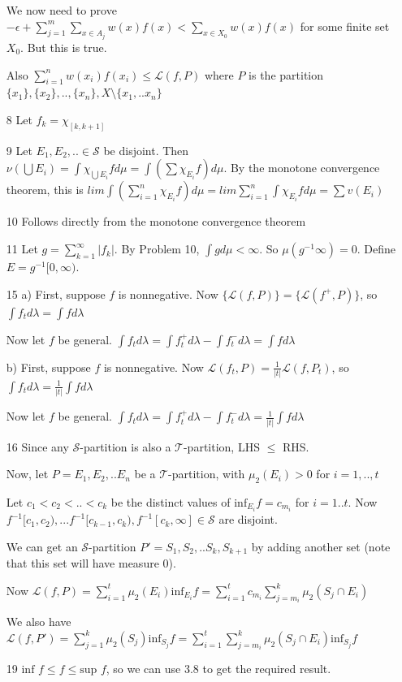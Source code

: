 \documentclass{article}
\begin{document}
\begin{itemize}
    We now need to prove $-\epsilon +\sum_{j=1}^m \sum_{x \in A_j} w(x)f(x)<\sum_{x \in X_0} w(x)f(x)$ for some finite set $X_0$. But this is true.

    Also $\sum_{i=1}^nw(x_i)f(x_i)\leq\mathcal{L}(f,P)$ where $P$ is the partition $\{x_1\},\{x_2\},..,\{x_n\},X\setminus\{x_1,..x_n\}$

    \item[8] Let $f_k=\chi_{[k,k+1]}$

    \item [9]
    Let $E_1,E_2,.. \in \mathcal{S}$ be disjoint. Then $\nu(\bigcup E_i)=\int \chi_{\bigcup E_i}fd\mu=\int (\sum \chi_{E_i}f)d\mu$. By the monotone convergence theorem, this is $lim\int (\sum_{i=1}^n \chi_{E_i}f)d\mu=lim \sum_{i=1}^n \int \chi_{E_i}fd\mu=\sum v(E_i)$

    \item [10] Follows directly from the monotone convergence theorem

    \item[11] Let $g=\sum_{k=1}^\infty|f_k|$. By Problem 10, $\int gd\mu<\infty$. So $\mu(g^{-1}\infty)=0$. Define $E=g^{-1}[0,\infty)$.

    \item[15]a) First, suppose $f$ is nonnegative. Now $\{\mathcal{L}(f,P)\}=\{\mathcal{L}(f^+,P)\}$, so $\int f_td\lambda=\int fd\lambda$

    Now let $f$ be general. $\int f_td\lambda=\int f_t^+d\lambda-\int f_t^-d\lambda=\int fd\lambda$

    b) First, suppose $f$ is nonnegative. Now $\mathcal{L}(f_t,P)=\frac{1}{|t|}\mathcal{L}(f,P_t)$, so \\$\int f_t d\lambda=\frac{1}{|t|}\int fd\lambda$

    Now let $f$ be general. $\int f_td\lambda=\int f_t^+d\lambda-\int f_t^-d\lambda=\frac{1}{|t|}\int f d\lambda$

    \item [16] Since any $\mathcal{S}$-partition is also a $\mathcal{T}$-partition, LHS $\leq$ RHS. 
    
    Now, let $P=E_1,E_2,..E_n$ be a $\mathcal{T}$-partition, with $\mu_2(E_i)>0$ for $i=1,..,t$ 
    
    
    Let $c_1<c_2<..<c_k$ be the distinct values of $\text{inf}_{E_i}f=c_{m_i}$ for $i=1..t$. Now $f^{-1}[c_1,c_2),...f^{-1}[c_{k-1},c_k),f^{-1}[c_k,\infty]\in \mathcal{S}$ are disjoint. 
    
    We can get an $\mathcal{S}$-partition $P'=S_1,S_2,..S_k,S_{k+1}$ by adding another set (note that this set will have measure 0). 
    
    Now $\mathcal{L}(f,P)=\sum_{i=1}^t \mu_2(E_i)\text{inf}_{E_i}f=\sum_{i=1}^t c_{m_i}\sum_{j=m_i}^k\mu_2(S_j\cap E_i)$

    We also have $\mathcal{L}(f,P')=\sum_{j=1}^k\mu_2(S_j)\text{inf}_{S_j}f=\sum_{i=1}^t\sum_{j=m_i}^k  \mu_2(S_j\cap E_i)\text{inf}_{S_j}f$

    \item[19]$\text{inf }f\leq f\leq \text{sup } f$, so we can use 3.8 to get the required result.
    

    
\end{itemize}
\end{document}

